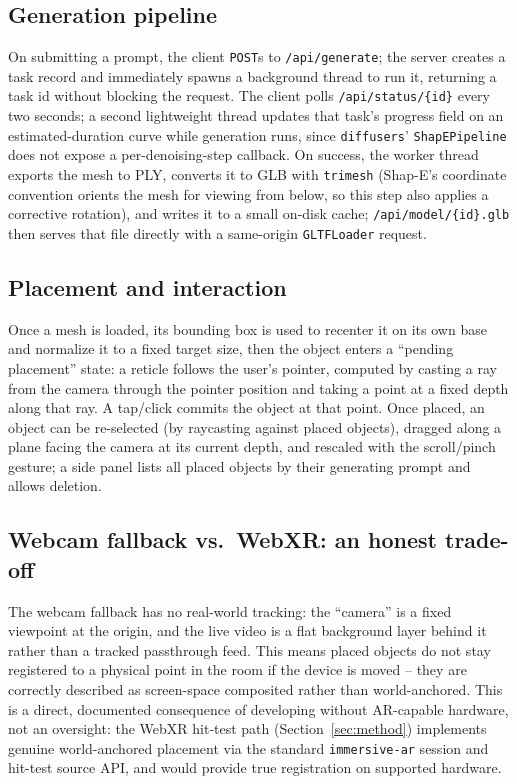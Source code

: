 \documentclass[sigconf,nonacm]{acmart}
\begin{document}
\subsection{Generation pipeline}
On submitting a prompt, the client \texttt{POST}s to \texttt{/api/generate};
the server creates a task record and immediately spawns a background
thread to run it, returning a task id without blocking the request. The
client polls \texttt{/api/status/\{id\}} every two seconds; a second
lightweight thread updates that task's progress field on an
estimated-duration curve while generation runs, since \texttt{diffusers}'
\texttt{ShapEPipeline} does not expose a per-denoising-step callback. On
success, the worker thread exports the mesh to PLY, converts it to GLB
with \texttt{trimesh} (Shap-E's coordinate convention orients the mesh
for viewing from below, so this step also applies a corrective rotation),
and writes it to a small on-disk cache; \texttt{/api/model/\{id\}.glb}
then serves that file directly with a same-origin \texttt{GLTFLoader}
request.

\subsection{Placement and interaction}
Once a mesh is loaded, its bounding box is used to recenter it on its own
base and normalize it to a fixed target size, then the object enters a
``pending placement'' state: a reticle follows the user's pointer,
computed by casting a ray from the camera through the pointer position and
taking a point at a fixed depth along that ray. A tap/click commits the
object at that point. Once placed, an object can be re-selected (by
raycasting against placed objects), dragged along a plane facing the
camera at its current depth, and rescaled with the scroll/pinch gesture;
a side panel lists all placed objects by their generating prompt and
allows deletion.

\subsection{Webcam fallback vs.\ WebXR: an honest trade-off}
The webcam fallback has no real-world tracking: the ``camera'' is a fixed
viewpoint at the origin, and the live video is a flat background layer
behind it rather than a tracked passthrough feed. This means placed
objects do not stay registered to a physical point in the room if the
device is moved -- they are correctly described as screen-space composited
rather than world-anchored. This is a direct, documented consequence of
developing without AR-capable hardware, not an oversight: the WebXR
hit-test path (Section~\ref{sec:method}) implements genuine world-anchored
placement via the standard \texttt{immersive-ar} session and hit-test
source API, and would provide true registration on supported hardware.
\end{document}
